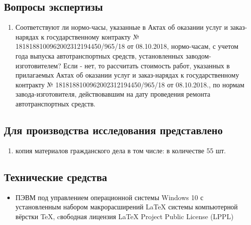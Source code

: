 \setcounter{page}{1}

%

%
\subsection{Вопросы экспертизы}

\begin{enumerate}
	\item Соответствуют ли нормо-часы, указанные в Актах об оказании услуг и заказ-нарядах к государственному контракту № 1818188100962002312194450/965/18 от 08.10.2018, нормо-часам, с учетом года выпуска автотранспортных средств, установленных заводом-изготовителем? Если - нет, то рассчитать стоимость работ, указанных в прилагаемых Актах об оказании услуг и заказ-нарядах к государственному контракту  № 1818188100962002312194450/965/18 от 08.10.2018., по нормам завода-изготовителя, действовавшим на дату проведения ремонта автотранспортных средств.
\end{enumerate}


\subsection{Для производства исследования представлено} %
\begin{enumerate}
	\item копия материалов гражданского дела в том числе: в количестве 55 шт. 
	\end{enumerate}
%
%
%


\subsection{Технические средства}  %
\begin{itemize}

%

\item  ПЭВМ под управлением операционной системы Windows 10 с установленным набором макрорасширений LaTeX системы компьютерной вёрстки TeX, cвободная лицензия LaTeX Project Public License (LPPL)
%	
\end{itemize}
